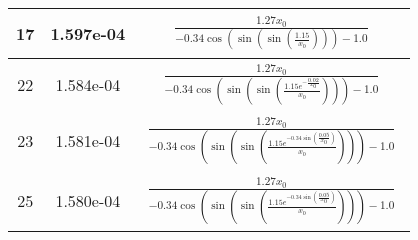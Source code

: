 \begin{center}
\begin{tabular}{|c|c|c|}
\hline17 & 1.597e-04 & $\begin{aligned}\frac{1.27 x_{0}}{- 0.34 \cos{\left(\sin{\left(\sin{\left(\frac{1.15}{x_{0}} \right)} \right)} \right)} - 1.0}\end{aligned}$\\ \hline22 & 1.584e-04 & $\begin{aligned}\frac{1.27 x_{0}}{- 0.34 \cos{\left(\sin{\left(\sin{\left(\frac{1.15 e^{- \frac{0.02}{x_{0}}}}{x_{0}} \right)} \right)} \right)} - 1.0}\end{aligned}$\\ \hline23 & 1.581e-04 & $\begin{aligned}\frac{1.27 x_{0}}{- 0.34 \cos{\left(\sin{\left(\sin{\left(\frac{1.15 e^{- 0.34 \sin{\left(\frac{0.05}{x_{0}} \right)}}}{x_{0}} \right)} \right)} \right)} - 1.0}\end{aligned}$\\ \hline25 & 1.580e-04 & $\begin{aligned}\frac{1.27 x_{0}}{- 0.34 \cos{\left(\sin{\left(\sin{\left(\frac{1.15 e^{- 0.34 \sin{\left(\frac{0.05}{x_{0}} \right)}}}{x_{0}} \right)} \right)} \right)} - 1.0}\end{aligned}$\\ \hline\end{tabular}
        \end{center}
        